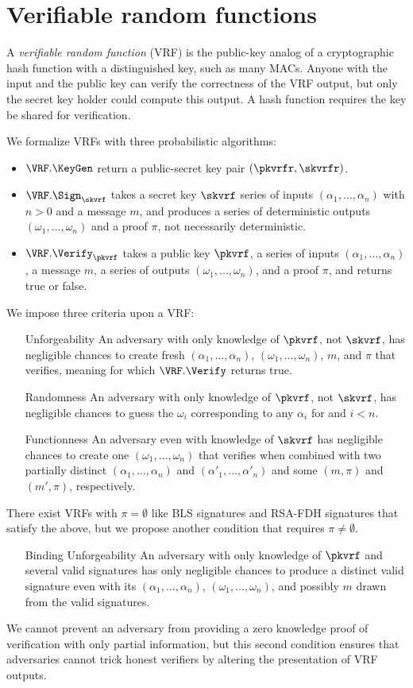 \section{Verifiable random functions}

A {\em verifiable random function} (VRF) is the public-key analog of a cryptographic hash function with a distinguished key, such as many MACs.  Anyone with the input and the public key can verify the correctness of the VRF output, but only the secret key holder could compute this output.  A hash function requires the key be shared for verification. 

We formalize VRFs with three probabilistic algorithms: 
\begin{itemize}
\item $\VRF.\KeyGen$ return a public-secret key pair $(\pkvrfr,\skvrfr)$.
\item $\VRF.\Sign_{\skvrf}$ takes a secret key $\skvrf$ series of inputs $(\alpha_1,\ldots,\alpha_n)$ with $n>0$ and a message $m$, and produces a series of deterministic outputs $(\omega_1,\ldots,\omega_n)$ and a proof $\pi$, not necessarily deterministic.
\item $\VRF.\Verify_{\pkvrf}$ takes a public key $\pkvrf$, a series of inputs $(\alpha_1,\ldots,\alpha_n)$, a message $m$, a series of outputs $(\omega_1,\ldots,\omega_n)$, and a proof $\pi$, and returns true or false.
\end{itemize}
We impose three criteria upon a VRF:
\begin{enumerate}
\item[Unforgeability] An adversary with only knowledge of $\pkvrf$, not $\skvrf$, has negligible chances to create fresh $(\alpha_1,\ldots,\alpha_n)$, $(\omega_1,\ldots,\omega_n)$, $m$, and $\pi$ that verifies, meaning for which $\VRF.\Verify$ returns true.
\item[Randomness] An adversary with only knowledge of $\pkvrf$, not $\skvrf$, has negligible chances to guess the $\omega_i$ corresponding to any $\alpha_i$ for and $i<n$.
\item[Functionness] An adversary even with knowledge of $\skvrf$ has negligible chances to create one $(\omega_1,\ldots,\omega_n)$ that verifies when combined with two partially distinct $(\alpha_1,\ldots,\alpha_n)$ and $(\alpha'_1,\ldots,\alpha'_n)$ and some $(m,\pi)$ and $(m',\pi)$, respectively.
\end{enumerate}
There exist VRFs with $\pi = \emptyset$ like BLS signatures and RSA-FDH signatures that satisfy the above, but we propose another condition that requires $\pi \ne \emptyset$.
\begin{enumerate}
\item[Binding Unforgeability] An adversary with only knowledge of $\pkvrf$ and several valid signatures has only negligible chances to produce a distinct valid signature even with its $(\alpha_1,\ldots,\alpha_n)$, $(\omega_1,\ldots,\omega_n)$, and possibly $m$ drawn from the valid signatures.
\end{enumerate}
We cannot prevent an adversary from providing a zero knowledge proof of verification with only partial information, but this second condition ensures that adversaries cannot trick honest verifiers by altering the presentation of VRF outputs.  

